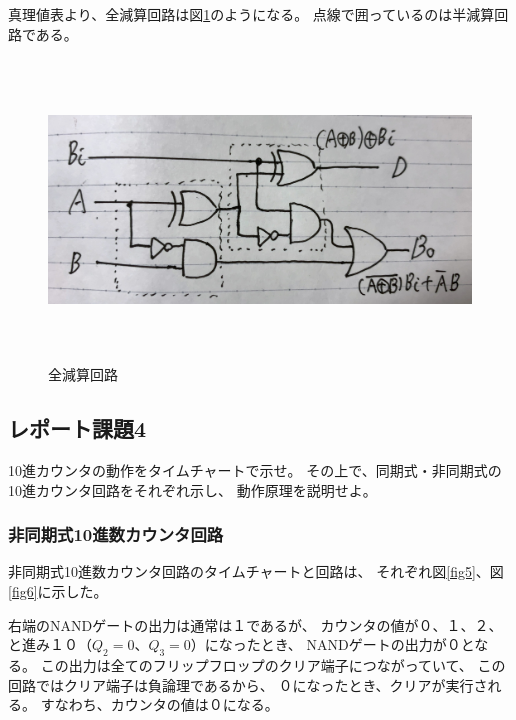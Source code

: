\documentclass[12pt]{jarticle}
\begin{document}
\begin{itemize}
          真理値表より、全減算回路は図\ref{fig2}のようになる。
          点線で囲っているのは半減算回路である。
          \begin{figure}[h]
              \begin{center}
                  \includegraphics[bb=0 0 4032 3024,height=8cm]{report3_fig2.jpg}
              \end{center}
              \caption{全減算回路}
              \label{fig2}
          \end{figure}
\end{itemize}

\clearpage
\subsection{レポート課題4}
\begin{shadebox}
    10進カウンタの動作をタイムチャートで示せ。
    その上で、同期式・非同期式の10進カウンタ回路をそれぞれ示し、
    動作原理を説明せよ。
\end{shadebox}
\subsubsection*{非同期式10進数カウンタ回路}
非同期式10進数カウンタ回路のタイムチャートと回路は、
それぞれ図\ref{fig5}、図\ref{fig6}に示した。

右端のNANDゲートの出力は通常は１であるが、
カウンタの値が０、１、２、と進み１０（$Q_2=0$、$Q_3=0$）になったとき、
NANDゲートの出力が０となる。
この出力は全てのフリップフロップのクリア端子につながっていて、
この回路ではクリア端子は負論理であるから、
０になったとき、クリアが実行される。
すなわち、カウンタの値は０になる。
\end{document}
